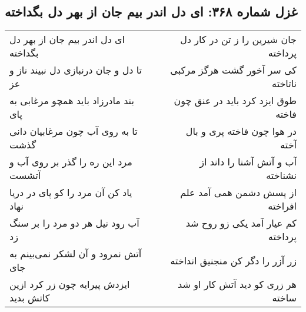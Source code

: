 \begin{center}
\section*{غزل شماره ۳۶۸: ای دل اندر بیم جان از بهر دل بگداخته}
\label{sec:368}
\begin{longtable}{l p{0.5cm} r}
ای دل اندر بیم جان از بهر دل بگداخته
&&
جان شیرین را ز تن در کار دل پرداخته
\\
تا دل و جان درنبازی دل نبیند ناز و عز
&&
کی سر آخور گشت هرگز مرکبی ناتاخته
\\
بند مادرزاد باید همچو مرغابی به پای
&&
طوق ایزد کرد باید در عنق چون فاخته
\\
تا به روی آب چون مرغابیان دانی گذشت
&&
در هوا چون فاخته پری و بال آخته
\\
مرد این ره را گذر بر روی آب و آتشست
&&
آب و آتش آشنا را داند از نشناخته
\\
یاد کن آن مرد را کو پای در دریا نهاد
&&
از پسش دشمن همی آمد علم افراخته
\\
آب رود نیل هر دو مرد را بر سنگ زد
&&
کم عیار آمد یکی زو روح شد پرداخته
\\
آتش نمرود و آن لشکر نمی‌بینم به جای
&&
زر آزر را دگر کن منجنیق انداخته
\\
ایزدش پیرایه چون زر کرد ازین کاتش بدید
&&
هر زری کو دید آتش کار او شد ساخته
\\
\end{longtable}
\end{center}
